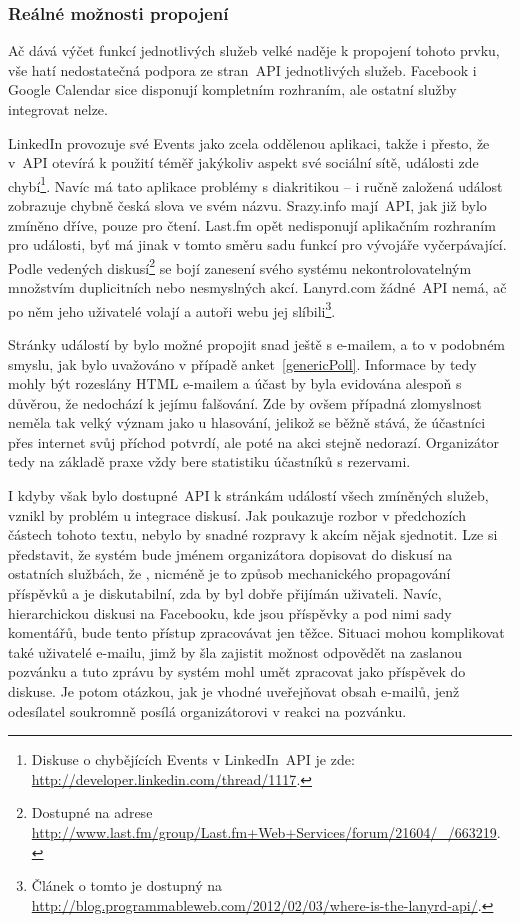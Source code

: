 \documentclass[12pt,oneside,final]{fithesis2}
\begin{document}
\subsubsection*{Reálné možnosti propojení}
Ač dává výčet funkcí jednotlivých služeb velké naděje k propojení tohoto prvku, vše hatí nedostatečná podpora ze stran~API jednotlivých služeb. Facebook i Google Calendar sice disponují kompletním rozhraním, ale ostatní služby integrovat nelze.

LinkedIn provozuje své Events jako zcela oddělenou aplikaci, takže i přesto, že v~API otevírá k použití téměř jakýkoliv aspekt své sociální sítě, události zde chybí\footnote{Diskuse o chybějících Events v LinkedIn~API je zde: \url{http://developer.linkedin.com/thread/1117}.}. Navíc má tato aplikace problémy s diakritikou -- i ručně založená událost zobrazuje chybně česká slova ve svém názvu. Srazy.info mají~API, jak již bylo zmíněno dříve, pouze pro čtení. Last.fm opět nedisponují aplikačním rozhraním pro události, byť má jinak v tomto směru sadu funkcí pro vývojáře vyčerpávající. Podle vedených diskusí\footnote{Dostupné na adrese \url{http://www.last.fm/group/Last.fm+Web+Services/forum/21604/_/663219}.} se bojí zanesení svého systému nekontrolovatelným množstvím duplicitních nebo nesmyslných akcí. Lanyrd.com žádné~API nemá, ač po něm jeho uživatelé volají a autoři webu jej slíbili\footnote{Článek o tomto je dostupný na \url{http://blog.programmableweb.com/2012/02/03/where-is-the-lanyrd-api/}.}.

Stránky událostí by bylo možné propojit snad ještě s e-mailem, a to v podobném smyslu, jak bylo uvažováno v případě anket~\ref{genericPoll}. Informace by tedy mohly být rozeslány HTML e-mailem a účast by byla evidována alespoň s důvěrou, že nedochází k jejímu falšování. Zde by ovšem případná zlomyslnost neměla tak velký význam jako u hlasování, jelikož se běžně stává, že účastníci přes internet svůj příchod potvrdí, ale poté na akci stejně nedorazí. Organizátor tedy na základě praxe vždy bere statistiku účastníků s rezervami.

I kdyby však bylo dostupné~API k stránkám událostí všech zmíněných služeb, vznikl by problém u integrace diskusí. Jak poukazuje rozbor v předchozích částech tohoto textu, nebylo by snadné rozpravy k akcím nějak sjednotit. Lze si představit, že systém bude jménem organizátora dopisovat do diskusí na ostatních službách, že , nicméně je to způsob mechanického propagování příspěvků a je diskutabilní, zda by byl dobře přijímán uživateli. Navíc, hierarchickou diskusi na Facebooku, kde jsou příspěvky a pod nimi sady komentářů, bude tento přístup zpracovávat jen těžce. Situaci mohou komplikovat také uživatelé e-mailu, jimž by šla zajistit možnost odpovědět na zaslanou pozvánku a tuto zprávu by systém mohl umět zpracovat jako příspěvek do diskuse. Je potom otázkou, jak je vhodné uveřejňovat obsah e-mailů, jenž odesílatel soukromně posílá organizátorovi v reakci na pozvánku.
\end{document}
